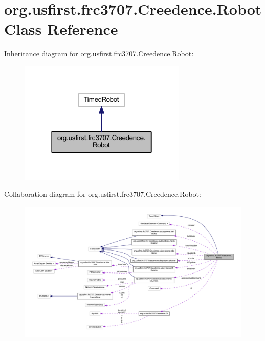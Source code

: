 \hypertarget{classorg_1_1usfirst_1_1frc3707_1_1_creedence_1_1_robot}{}\section{org.\+usfirst.\+frc3707.\+Creedence.\+Robot Class Reference}
\label{classorg_1_1usfirst_1_1frc3707_1_1_creedence_1_1_robot}


Inheritance diagram for org.\+usfirst.\+frc3707.\+Creedence.\+Robot\+:
\nopagebreak
\begin{figure}[H]
\begin{center}
\leavevmode
\includegraphics[width=226pt]{classorg_1_1usfirst_1_1frc3707_1_1_creedence_1_1_robot__inherit__graph}
\end{center}
\end{figure}


Collaboration diagram for org.\+usfirst.\+frc3707.\+Creedence.\+Robot\+:
\nopagebreak
\begin{figure}[H]
\begin{center}
\leavevmode
\includegraphics[width=350pt]{classorg_1_1usfirst_1_1frc3707_1_1_creedence_1_1_robot__coll__graph}
\end{center}
\end{figure}
